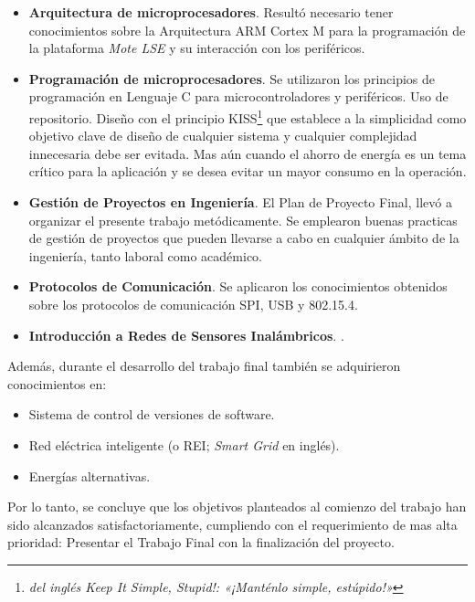 \begin{itemize}
\item
\textbf{Arquitectura de microprocesadores}. Resultó necesario tener conocimientos sobre la Arquitectura ARM Cortex M para la programación de la plataforma \textit{Mote LSE} y su interacción con los periféricos.

\item
\textbf{Programación de microprocesadores}. Se utilizaron los principios de programación en Lenguaje C para microcontroladores y periféricos. Uso de repositorio. Diseño con el principio KISS\footnote{\textit{del inglés Keep It Simple, Stupid!: «¡Manténlo simple, estúpido!»}} que establece a la simplicidad como objetivo clave de diseño de cualquier sistema y cualquier complejidad innecesaria debe ser evitada. Mas aún cuando el ahorro de energía es un tema crítico para la aplicación y se desea evitar un mayor consumo en la operación. 

\item
\textbf{Gestión de Proyectos en Ingeniería}. El Plan de Proyecto Final, llevó a organizar el presente trabajo metódicamente. Se emplearon buenas practicas de gestión de proyectos que pueden llevarse a cabo en cualquier ámbito de la ingeniería, tanto laboral como académico.

\item 
\textbf{Protocolos de Comunicación}. Se aplicaron los conocimientos obtenidos sobre los protocolos de comunicación SPI, USB y 802.15.4.

\item 
\textbf{Introducción a Redes de Sensores Inalámbricos}. .
\end{itemize}

\medskip

\noindent Además, durante el desarrollo del trabajo final también se adquirieron conocimientos en:

\begin{itemize}
	\item Sistema de control de versiones de software.
	\item Red eléctrica inteligente (o REI; \textit{Smart Grid} en inglés).
	\item Energías alternativas.	
\end{itemize}

\medskip

Por lo tanto, se concluye que los objetivos planteados al comienzo del trabajo han sido alcanzados satisfactoriamente, cumpliendo con el requerimiento de mas alta prioridad: Presentar el Trabajo Final con la finalización del proyecto.

